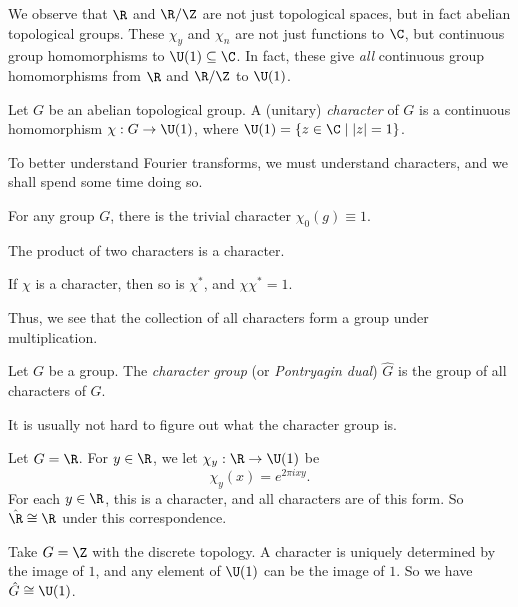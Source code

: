 \documentclass[a4paper]{article}
\begin{document}
We observe that $\R$ and $\R/\Z$ are not just topological spaces, but in fact abelian topological groups. These $\chi_y$ and $\chi_n$ are not just functions to $\C$, but continuous group homomorphisms to $\U(1) \subseteq \C$. In fact, these give \emph{all} continuous group homomorphisms from $\R$ and $\R/\Z$ to $\U(1)$.

\begin{defi}[Character]
  Let $G$ be an abelian topological group. A (unitary) \emph{character} of $G$ is a continuous homomorphism $\chi: G \to \U(1)$, where $\U(1) = \{z \in \C \mid |z| = 1\}$.
\end{defi}
To better understand Fourier transforms, we must understand characters, and we shall spend some time doing so.

\begin{eg}
  For any group $G$, there is the trivial character $\chi_0(g) \equiv 1$.
\end{eg}
  
\begin{eg}
  The product of two characters is a character.
\end{eg}

\begin{eg}
 If $\chi$ is a character, then so is $\chi^*$, and $\chi \chi^* = 1$.
\end{eg}

Thus, we see that the collection of all characters form a group under multiplication.
\begin{defi}
  Let $G$ be a group. The \emph{character group} (or \emph{Pontryagin dual}) $\hat{G}$ is the group of all characters of $G$.
\end{defi}

It is usually not hard to figure out what the character group is.
\begin{eg}
  Let $G = \R$. For $y \in \R$, we let $\chi_y: \R \to \U(1)$ be
  \[
    \chi_y(x) = e^{2\pi i xy}.
  \]
  For each $y \in \R$, this is a character, and all characters are of this form. So $\hat{\R} \cong \R$ under this correspondence.
\end{eg}

\begin{eg}
  Take $G = \Z$ with the discrete topology. A character is uniquely determined by the image of $1$, and any element of $\U(1)$ can be the image of $1$. So we have $\hat{G} \cong \U(1)$.
\end{eg}
\end{document}

